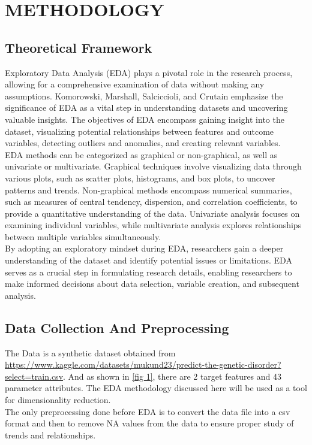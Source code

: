 \chapter{METHODOLOGY}

\section{{\bf{Theoretical Framework}}}

Exploratory Data Analysis (EDA) plays a pivotal role in the research process, allowing for a comprehensive examination of data without making any assumptions. Komorowski, Marshall, Salciccioli, and Crutain \cite{komorowski2016exploratory} emphasize the significance of EDA as a vital step in understanding datasets and uncovering valuable insights. The objectives of EDA encompass gaining insight into the dataset, visualizing potential relationships between features and outcome variables, detecting outliers and anomalies, and creating relevant variables. \\
\noindent
EDA methods can be categorized as graphical or non-graphical, as well as univariate or multivariate. Graphical techniques involve visualizing data through various plots, such as scatter plots, histograms, and box plots, to uncover patterns and trends. Non-graphical methods encompass numerical summaries, such as measures of central tendency, dispersion, and correlation coefficients, to provide a quantitative understanding of the data. Univariate analysis focuses on examining individual variables, while multivariate analysis explores relationships between multiple variables simultaneously.\\
\noindent
By adopting an exploratory mindset during EDA, researchers gain a deeper understanding of the dataset and identify potential issues or limitations. EDA serves as a crucial step in formulating research details, enabling researchers to make informed decisions about data selection, variable creation, and subsequent analysis.




\section{{\bf{Data Collection And Preprocessing}}}
The Data is a synthetic dataset obtained from \url{https://www.kaggle.com/datasets/mukund23/predict-the-genetic-disorder?select=train.csv}. And as shown in \ref{fig 1}, there are 2 target features and 43 parameter attributes. The EDA methodology discussed here will be used as a tool for dimensionality reduction.
 \\
\noindent
The only preprocessing done before EDA is to convert the data file into a csv format and then to remove NA values from the data to ensure proper study of trends and relationships.


